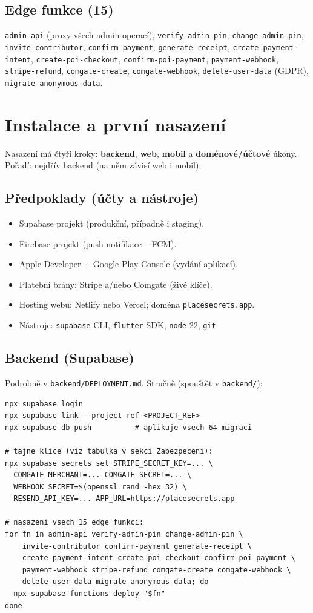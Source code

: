 \documentclass[11pt,a4paper]{article}
\newcommand{\code}[1]{\texttt{#1}}
\begin{document}
\subsection{Edge funkce (15)}
\code{admin-api} (proxy všech admin operací), \code{verify-admin-pin},
\code{change-admin-pin}, \code{invite-contributor}, \code{confirm-payment},
\code{generate-receipt}, \code{create-payment-intent}, \code{create-poi-checkout},
\code{confirm-poi-payment}, \code{payment-webhook}, \code{stripe-refund},
\code{comgate-create}, \code{comgate-webhook}, \code{delete-user-data} (GDPR),
\code{migrate-anonymous-data}.

\section{Instalace a první nasazení}
Nasazení má čtyři kroky: \textbf{backend}, \textbf{web}, \textbf{mobil} a
\textbf{doménové/účtové} úkony. Pořadí: nejdřív backend (na něm závisí web i mobil).

\subsection{Předpoklady (účty a nástroje)}
\begin{itemize}[nosep]
  \item Supabase projekt (produkční, případně i staging).
  \item Firebase projekt (push notifikace -- FCM).
  \item Apple Developer + Google Play Console (vydání aplikací).
  \item Platební brány: Stripe a/nebo Comgate (živé klíče).
  \item Hosting webu: Netlify nebo Vercel; doména \code{placesecrets.app}.
  \item Nástroje: \code{supabase} CLI, \code{flutter} SDK, \code{node} 22, \code{git}.
\end{itemize}

\subsection{Backend (Supabase)}
Podrobně v \code{backend/DEPLOYMENT.md}. Stručně (spouštět v \code{backend/}):
\begin{lstlisting}
npx supabase login
npx supabase link --project-ref <PROJECT_REF>
npx supabase db push          # aplikuje vsech 64 migraci

# tajne klice (viz tabulka v sekci Zabezpeceni):
npx supabase secrets set STRIPE_SECRET_KEY=... \
  COMGATE_MERCHANT=... COMGATE_SECRET=... \
  WEBHOOK_SECRET=$(openssl rand -hex 32) \
  RESEND_API_KEY=... APP_URL=https://placesecrets.app

# nasazeni vsech 15 edge funkci:
for fn in admin-api verify-admin-pin change-admin-pin \
    invite-contributor confirm-payment generate-receipt \
    create-payment-intent create-poi-checkout confirm-poi-payment \
    payment-webhook stripe-refund comgate-create comgate-webhook \
    delete-user-data migrate-anonymous-data; do
  npx supabase functions deploy "$fn"
done
\end{lstlisting}
\end{document}
